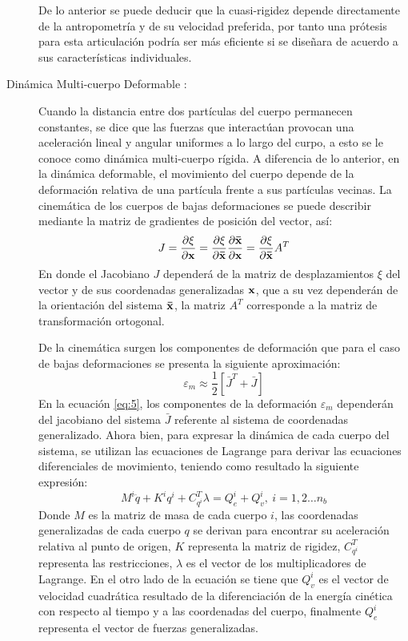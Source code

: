 \documentclass[12pt,english]{article}
\begin{document}
\begin{description}
De lo anterior se puede deducir que la cuasi-rigidez depende directamente
de la antropometría y de su velocidad preferida, por tanto una prótesis
para esta articulación podría ser más eficiente si se diseñara de
acuerdo a sus características individuales.
\item[{Dinámica Multi-cuerpo Deformable \cite{Shabana2013}: }] Cuando la distancia entre dos partículas del cuerpo permanecen constantes, se dice que las fuerzas que interactúan provocan una aceleración lineal y angular uniformes a lo largo del curpo, a esto se le conoce como dinámica multi-cuerpo rígida. 
A diferencia de lo anterior, en la dinámica deformable, el movimiento del cuerpo depende de la deformación relativa de una partícula frente a sus partículas vecinas. La cinemática de los cuerpos de bajas deformaciones se puede describir mediante la matriz de gradientes de posición del vector, así:
\begin{equation}
J=\frac{\partial{\xi}}{\partial{\bf{x}}}=\frac{\partial{\xi}}{\partial{\bf{\bar{x}}}}\frac{\partial\bf{\bar{x}}}{\partial{\bf{x}}}=\frac{\partial{\xi}}{\partial{\bf{\bar{x}}}}A^{T}
\end{equation}
En donde el Jacobiano $J$ dependerá de la matriz de desplazamientos $\xi$ del vector y de sus coordenadas generalizadas $\bf{x}$, que a su vez dependerán de la orientación del sistema $\bf{\bar{x}}$, la matriz $A^{T}$ corresponde a la matriz de transformación ortogonal.

De la cinemática surgen los componentes de deformación que para el caso de bajas deformaciones se presenta la siguiente aproximación:
\begin{equation}
\varepsilon_{m}\approx\frac{1}{2}[\bar{J}^{T}+\bar{J}] \label{eq:5}
\end{equation}
En la ecuación \ref{eq:5}, los componentes de la deformación $\varepsilon_{m}$ dependerán del jacobiano del sistema  $\bar{J}$ referente al sistema de coordenadas generalizado.
Ahora bien, para expresar la dinámica de cada cuerpo del sistema, se utilizan las ecuaciones de Lagrange para derivar las ecuaciones diferenciales de movimiento, teniendo como resultado la siguiente expresión:
\begin{equation}
M^{i}\ddot{q}+K^{i}q^{i}+C_{q^{i}}^{T}\lambda=Q_{e}^{i}+Q_{v}^{i},\:i=1,2\ldots n_{b} \label{eq:6}
\end{equation}
Donde $M$ es la matriz de masa de cada cuerpo $i$, las coordenadas generalizadas de cada cuerpo $q$ se derivan para encontrar su aceleración relativa al punto de origen, $K$ representa la matriz de rigidez, $C_{q^{i}}^{T}$ representa las restricciones, $\lambda$ es el vector de los multiplicadores de Lagrange. En el otro lado de la ecuación se tiene que $Q_{v}^{i}$ es el vector de velocidad cuadrática resultado de la diferenciación de la energía cinética con respecto al tiempo y a las coordenadas del cuerpo, finalmente $Q_{e}^{i}$ representa el vector de fuerzas generalizadas.



\end{description}
\end{document}
